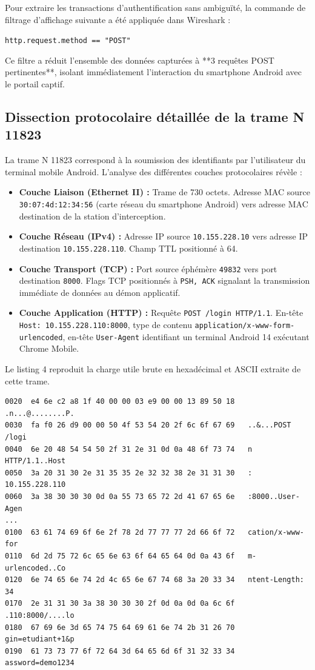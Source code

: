 \documentclass[a4paper,11pt]{article}
\begin{document}
Pour extraire les transactions d'authentification sans ambiguïté, la commande de filtrage d'affichage suivante a été appliquée dans Wireshark :
\begin{center}
\texttt{http.request.method == "POST"}
\end{center}
Ce filtre a réduit l'ensemble des données capturées à **3 requêtes POST pertinentes**, isolant immédiatement l'interaction du smartphone Android avec le portail captif.

\subsection{Dissection protocolaire détaillée de la trame N 11823}
La trame N 11823 correspond à la soumission des identifiants par l'utilisateur du terminal mobile Android. L'analyse des différentes couches protocolaires révèle :
\begin{itemize}
  \item \textbf{Couche Liaison (Ethernet II) :} Trame de 730 octets. Adresse MAC source \texttt{30:07:4d:12:34:56} (carte réseau du smartphone Android) vers adresse MAC destination de la station d'interception.
  \item \textbf{Couche Réseau (IPv4) :} Adresse IP source \texttt{10.155.228.10} vers adresse IP destination \texttt{10.155.228.110}. Champ TTL positionné à 64.
  \item \textbf{Couche Transport (TCP) :} Port source éphémère \texttt{49832} vers port destination \texttt{8000}. Flags TCP positionnés à \texttt{PSH, ACK} signalant la transmission immédiate de données au démon applicatif.
  \item \textbf{Couche Application (HTTP) :} Requête \texttt{POST /login HTTP/1.1}. En-tête \texttt{Host: 10.155.228.110:8000}, type de contenu \texttt{application/x-www-form-urlencoded}, en-tête \texttt{User-Agent} identifiant un terminal Android 14 exécutant Chrome Mobile.
\end{itemize}

Le listing 4 reproduit la charge utile brute en hexadécimal et ASCII extraite de cette trame.

\begin{lstlisting}[caption={Extrait hexadécimal et ASCII brut de la trame 11823 capturée sous Wireshark}]
0020  e4 6e c2 a8 1f 40 00 00 03 e9 00 00 13 89 50 18   .n...@........P.
0030  fa f0 26 d9 00 00 50 4f 53 54 20 2f 6c 6f 67 69   ..&...POST /logi
0040  6e 20 48 54 54 50 2f 31 2e 31 0d 0a 48 6f 73 74   n HTTP/1.1..Host
0050  3a 20 31 30 2e 31 35 35 2e 32 32 38 2e 31 31 30   : 10.155.228.110
0060  3a 38 30 30 30 0d 0a 55 73 65 72 2d 41 67 65 6e   :8000..User-Agen
...
0100  63 61 74 69 6f 6e 2f 78 2d 77 77 77 2d 66 6f 72   cation/x-www-for
0110  6d 2d 75 72 6c 65 6e 63 6f 64 65 64 0d 0a 43 6f   m-urlencoded..Co
0120  6e 74 65 6e 74 2d 4c 65 6e 67 74 68 3a 20 33 34   ntent-Length: 34
0170  2e 31 31 30 3a 38 30 30 30 2f 0d 0a 0d 0a 6c 6f   .110:8000/....lo
0180  67 69 6e 3d 65 74 75 64 69 61 6e 74 2b 31 26 70   gin=etudiant+1&p
0190  61 73 73 77 6f 72 64 3d 64 65 6d 6f 31 32 33 34   assword=demo1234
\end{lstlisting}
\end{document}
